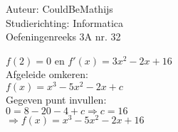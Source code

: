 \documentclass[a4paper]{article}
\begin{document}
  
\noindent \large Auteur: CouldBeMathijs \\
\noindent \large Studierichting: Informatica\\
\noindent \large Oefeningenreeks 3A nr. 32\\

\medskip

\normalsize

$f(2) = 0$ en $f'(x) = 3x^2 - 2x + 16$\\

Afgeleide omkeren:\\

$f(x) = x^3 - 5x^2 - 2x + c$\\

Gegeven punt invullen:\\

$0 = 8 - 20 - 4 + c \Rightarrow c = 16$\\

$\Rightarrow f(x) = x^3 - 5x^2 - 2x + 16$

\begin{thebibliography}{999}
\end{thebibliography}
\end{document}
